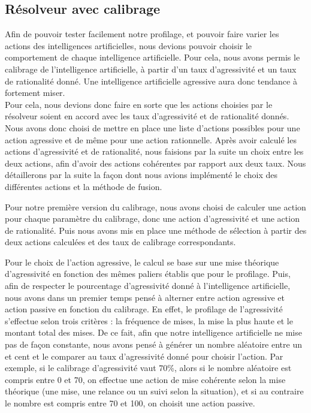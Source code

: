 \documentclass{report}
\begin{document}
\subsection{Résolveur avec calibrage}

\hspace{0.5cm}Afin de pouvoir tester facilement notre profilage, et pouvoir faire varier les actions des intelligences artificielles, nous devions pouvoir choisir le comportement de chaque intelligence artificielle. Pour cela, nous avons permis le calibrage de l'intelligence artificielle, à partir d'un taux d'agressivité et un taux de rationalité donné. Une intelligence artificielle agressive aura donc tendance à fortement miser.\\

Pour cela, nous devions donc faire en sorte que les actions choisies par le résolveur soient en accord avec les taux d'agressivité et de rationalité donnés. Nous avons donc choisi de mettre en place une liste d'actions possibles pour une action agressive et de même pour une action rationnelle. Après avoir calculé les actions d'agressivité et de rationalité, nous faisions par la suite un choix entre les deux actions, afin d'avoir des actions cohérentes par rapport aux deux taux. Nous détaillerons par la suite la façon dont nous avions implémenté le choix des différentes actions et la méthode de fusion.\par

Pour notre première version du calibrage, nous avons choisi de calculer une action pour chaque paramètre du calibrage, donc une action d'agressivité et une action de rationalité. Puis nous avons mis en place une méthode de sélection à partir des deux actions calculées et des taux de calibrage correspondants.\par
Pour le choix de l'action agressive, le calcul se base sur une mise théorique d'agressivité en fonction des mêmes paliers établis que pour le profilage. Puis, afin de respecter le pourcentage d'agressivité donné à l'intelligence artificielle, nous avons dans un premier temps pensé à alterner entre action agressive et action passive en fonction du calibrage. En effet, le profilage de l'agressivité s'effectue selon trois critères : la fréquence de mises, la mise la plus haute et le montant total des mises. De ce fait, afin que notre intelligence artificielle ne mise pas de façon constante, nous avons pensé à générer un nombre aléatoire entre un et cent et le comparer au taux d'agressivité donné pour choisir l'action. Par exemple, si le calibrage d'agressivité vaut 70\%, alors si le nombre aléatoire est compris entre 0 et 70, on effectue une action de mise cohérente selon la mise théorique (une mise, une relance ou un suivi selon la situation), et si au contraire le nombre est compris entre 70 et 100, on choisit une action passive.\par
\end{document}
